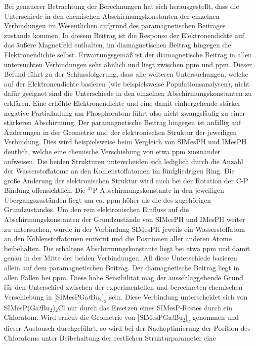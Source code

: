 Bei genauerer Betrachtung der Berechnungen hat sich herausgestellt, dass die Unterschiede in den chemischen Abschirmungskonstanten der einzelnen Verbindungen im Wesentlichen aufgrund des paramagnetischen Beitrages zustande kommen. In diesem Beitrag ist die Response der Elektronendichte auf das äußere Magnetfeld enthalten, im diamagnetischen Beitrag hingegen die Elektronendichte selbst. Erwartungsgemäß ist der diamagnetische Beitrag in allen untersuchten Verbindungen sehr ähnlich und liegt zwischen \unit[960]{ppm} und \unit[967]{ppm}. Dieser Befund führt zu der Schlussfolgerung, dass alle weiteren Untersuchungen, welche auf der Elektronendichte basieren (wie beispielsweise Populationsanalysen), nicht dafür geeignet sind die Unterschiede in den einzelnen Abschirmungskonstanten zu erklären. Eine erhöhte Elektronendichte und eine damit einhergehende stärker negative Partialladung am Phosphoratom führt also nicht zwangsläufig zu einer stärkeren Abschirmung. Der paramagnetische Beitrag hingegen ist anfällig auf Änderungen in der Geometrie und der elektronischen Struktur der jeweiligen Verbindung. Dies wird beispielsweise beim Vergleich von SIMesPH und IMesPH deutlich, welche eine chemische Verschiebung von etwa \unit[20]{ppm} zueinander aufweisen. Die beiden Strukturen unterscheiden sich lediglich durch die Anzahl der Wasserstoffatome an den Kohlenstoffatomen im fünfgliedrigen Ring. Die große Änderung der elektronischen Struktur wird auch bei der Rotation der C-P Bindung offensichtlich. Die $^{31}$P Abschirmungskonstante in den jeweiligen Übergangszuständen liegt um ca. \unit[60]{ppm} höher als die des zugehörigen Grundzustandes. Um den rein elektronischen Einfluss auf die Abschirmungskonstanten der Grundzustände von SIMesPH und IMesPH weiter zu untersuchen, wurde in der Verbindung SIMesPH jeweils ein Wasserstoffatom an den Kohlenstoffatomen entfernt und die Positionen aller anderen Atome beibehalten. Die erhaltene Abschirmungskonstante liegt bei etwa \unit[444]{ppm} und damit genau in der Mitte der beiden Verbindungen. All diese Unterschiede basieren allein auf dem paramagnetischen Beitrag. Der diamagnetische Beitrag liegt in allen Fällen bei \unit[962]{ppm}.
Diese hohe Sensibilität mag der ausschlaggebende Grund für den Unterschied zwischen der experimentellen und berechneten chemischen Verschiebung in $[$SIMesPGa\textit{t}Bu$_2]_2$ sein. Diese Verbindung unterscheidet sich von SIMesP(Ga\textit{t}Bu$_2$)$_2$Cl nur durch das Ersetzen eines SIMesP-Restes durch ein Chloratom. Wird erneut die Geometrie von $[$SIMesPGa\textit{t}Bu$_2]_2$ genommen und dieser Austausch durchgeführt, so wird bei der Nachoptimierung der Position des Chloratoms unter Beibehaltung der restlichen Strukturparameter eine 
